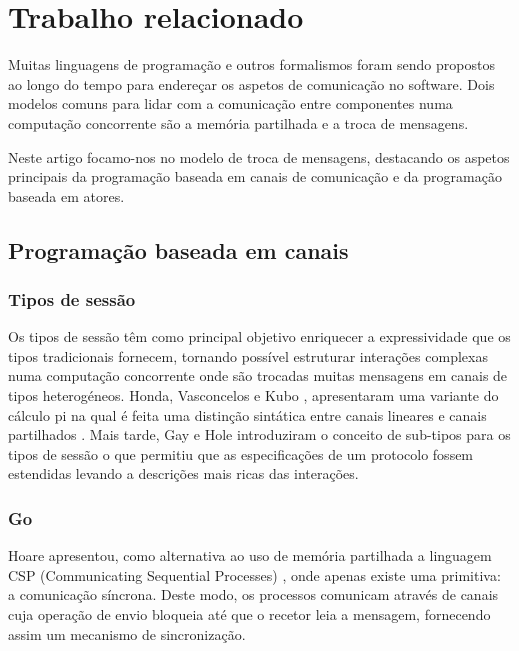 
\section{Trabalho relacionado}
\label{sec:rel-work}

Muitas linguagens de programação e outros formalismos foram sendo propostos ao longo do tempo para endereçar os aspetos de comunicação no software. Dois modelos comuns para lidar com a comunicação entre componentes numa computação concorrente são a memória partilhada e a troca de mensagens.

Neste artigo focamo-nos no modelo de troca de mensagens, destacando os aspetos principais da programação baseada em canais de comunicação e da programação baseada em atores.

\subsection{Programação baseada em canais}
\label{sec:prog-chan}

\subsubsection{Tipos de sessão}
\label{sec:session-types} Os tipos de sessão têm como principal objetivo enriquecer a expressividade que os tipos tradicionais fornecem, tornando possível estruturar interações complexas numa computação
concorrente onde são trocadas muitas mensagens em canais de tipos heterogéneos. Honda, Vasconcelos e Kubo \cite{ref-lang-primitives}, apresentaram uma variante do cálculo pi na qual é feita uma distinção sintática entre canais lineares e canais partilhados \cite{ref-lang-primitives}. Mais tarde, Gay e Hole \cite{ref-sessions-pi} introduziram o conceito de sub-tipos para os tipos de sessão o que permitiu que as especificações de um protocolo fossem estendidas levando a descrições mais ricas das interações.


\subsubsection{Go}
\label{sec:go}
\lstset{language=Golang}
Hoare apresentou, como alternativa ao uso de memória partilhada a linguagem CSP (Communicating Sequential Processes) \cite{ref-CSP-Hoare}, onde apenas existe uma primitiva: a comunicação síncrona. Deste modo, os processos comunicam através de canais cuja operação de envio bloqueia até que o recetor leia a mensagem, fornecendo assim um mecanismo de sincronização.

